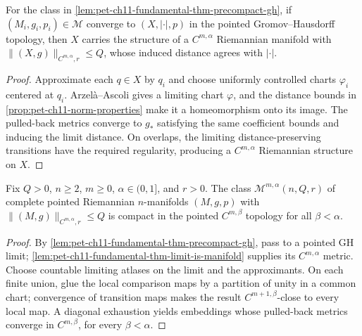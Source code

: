 \begin{lemma}
  \label{lem:pet-ch11-fundamental-thm-limit-is-manifold}
  For the class in \cref{lem:pet-ch11-fundamental-thm-precompact-gh}, if
  $(M_i,g_i,p_i)\in\mathcal{M}$ converge to $(X,|\cdot|,p)$ in the pointed
  Gromov--Hausdorff topology, then $X$ carries the structure of a $C^{m,\alpha}$
  Riemannian manifold with $\|(X,g)\|_{C^{m,\alpha},r}\le Q$, whose induced
  distance agrees with $|\cdot|$.
\end{lemma}
\begin{proof}
  \sketch
  Approximate each \(q\in X\) by \(q_i\) and choose uniformly controlled
  charts \(\varphi_i\) centered at \(q_i\). Arzelà--Ascoli gives a limiting
  chart \(\varphi\), and the distance bounds in
  \cref{prop:pet-ch11-norm-properties} make it a homeomorphism onto its image.
  The pulled-back metrics converge to \(g_*\) satisfying the same coefficient
  bounds and inducing the limit distance. On overlaps, the limiting
  distance-preserving transitions have the required regularity, producing a
  \(C^{m,\alpha}\) Riemannian structure on \(X\).
\end{proof}


\begin{theorem}
  \label{thm:pet-ch11-fundamental-theorem-convergence}
  Fix $Q>0$, $n\ge2$, $m\ge0$, $\alpha\in(0,1]$, and $r>0$. The class
  $\mathcal{M}^{m,\alpha}(n,Q,r)$ of complete pointed Riemannian $n$-manifolds
  $(M,g,p)$ with $\|(M,g)\|_{C^{m,\alpha},r}\le Q$ is compact in the pointed
  $C^{m,\beta}$ topology for all $\beta<\alpha$.
\end{theorem}
\begin{proof}
  \sketch
  By \cref{lem:pet-ch11-fundamental-thm-precompact-gh}, pass to a pointed GH limit; \cref{lem:pet-ch11-fundamental-thm-limit-is-manifold} supplies its \(C^{m,\alpha}\) metric. Choose countable limiting atlases on the limit and the approximants. On each finite union, glue the local comparison maps by a partition of unity in a common chart; convergence of transition maps makes the result \(C^{m+1,\beta}\)-close to every local map. A diagonal exhaustion yields embeddings whose pulled-back metrics converge in \(C^{m,\beta}\), for every \(\beta<\alpha\).
\end{proof}


